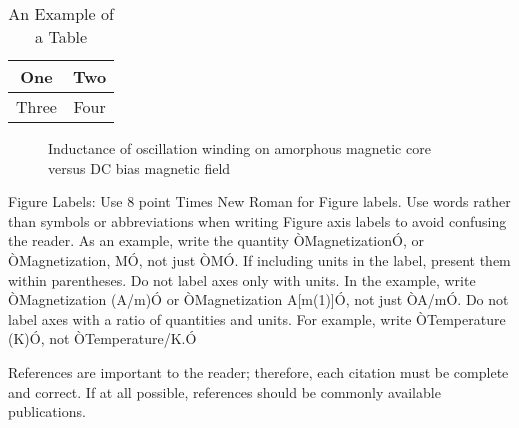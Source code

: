 \documentclass[a4paper, 10pt, conference]{ieeeconf}      %
\begin{document}
\begin{table}[h]
	\caption{An Example of a Table}
	\label{table_example}
	\begin{center}
		\begin{tabular}{|c||c|}
			\hline
			One & Two\\
			\hline
			Three & Four\\
			\hline
		\end{tabular}
	\end{center}
\end{table}


\begin{figure}[thpb]
	\centering
	\caption{Inductance of oscillation winding on amorphous
		magnetic core versus DC bias magnetic field}
	\label{figurelabel}
\end{figure}


Figure Labels: Use 8 point Times New Roman for Figure labels. Use words rather than symbols or abbreviations when writing Figure axis labels to avoid confusing the reader. As an example, write the quantity ÒMagnetizationÓ, or ÒMagnetization, MÓ, not just ÒMÓ. If including units in the label, present them within parentheses. Do not label axes only with units. In the example, write ÒMagnetization (A/m)Ó or ÒMagnetization {A[m(1)]}Ó, not just ÒA/mÓ. Do not label axes with a ratio of quantities and units. For example, write ÒTemperature (K)Ó, not ÒTemperature/K.Ó





References are important to the reader; therefore, each citation must be complete and correct. If at all possible, references should be commonly available publications.
\end{document}
